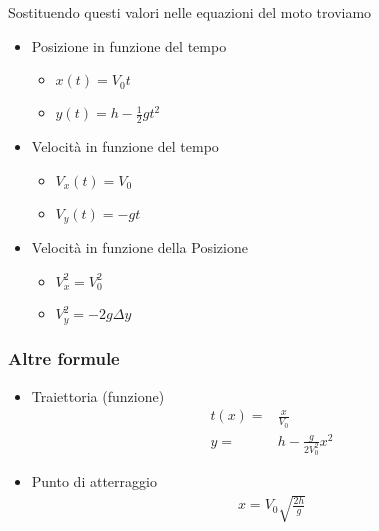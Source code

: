 \documentclass[../main.tex]{subfiles}
\begin{document}
Sostituendo questi valori nelle equazioni del moto troviamo
\begin{itemize}
    \item Posizione in funzione del tempo
    \begin{itemize}
        \item $x(t) = V_{0}t$
        \item $y(t) = h - \frac{1}{2}gt^2$
    \end{itemize}
    \item Velocità in funzione del tempo
    \begin{itemize}
        \item $V_x(t) = V_{0}$
        \item $V_y(t) = - gt$
    \end{itemize}
    \item Velocità in funzione della Posizione
    \begin{itemize}
        \item $V_x^2 = V_{0}^2$
        \item $V_y^2 = - 2g\Delta y$
    \end{itemize}
\end{itemize}

\subsubsection{Altre formule}
\begin{itemize}
    \item Traiettoria (funzione) \begin{align*}
        t(x) =& \frac{x}{V_0} \\
        y =& h - \frac{g}{2V_0^2}x^2
    \end{align*} 
    \item Punto di atterraggio \begin{align*}
        x = V_0 \sqrt{\frac{2h}{g}}
    \end{align*}
\end{itemize}

\vspace{1cm}
\end{document}
